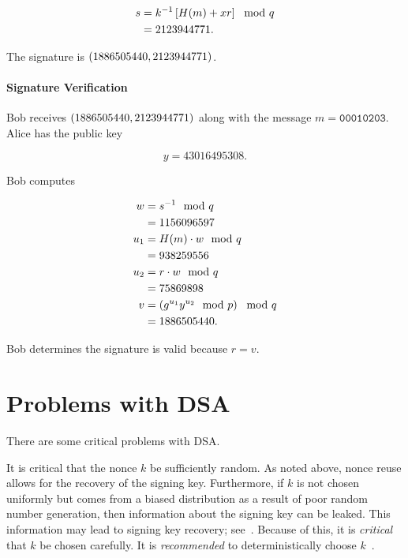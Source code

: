 \begin{example}
\begin{align}
    s &= k^{-1}\left[ H(m) + xr \right] \mod q \nonumber\\
        &= 2123944771.
\end{align}

\noindent
The signature is $\left( 1886505440, 2123944771 \right)$.

\paragraph{Signature Verification}
Bob receives $\left( 1886505440, 2123944771 \right)$
along with the message $m = \texttt{00010203}$.
Alice has the public key

\begin{equation}
    y = 43016495308.
\end{equation}

\noindent
Bob computes

\begin{align}
    w &= s^{-1} \mod q \nonumber\\
        &= 1156096597 \nonumber\\
    u_{1} &= H(m)\cdot w \mod q \nonumber\\
        &= 938259556 \nonumber\\
    u_{2} &= r\cdot w \mod q \nonumber\\
        &= 75869898 \nonumber\\
    v &= \left( g^{u_{1}}y^{u_{2}} \mod p \right) \mod q \nonumber\\
        &= 1886505440.
\end{align}

\noindent
Bob determines the signature is valid because $r = v$.
\end{example}



\section{Problems with DSA}

There are some critical problems with DSA.

It is critical that the \gls{nonce} $k$ be sufficiently random.
As noted above, \gls{nonce} reuse allows for the recovery of the signing key.
Furthermore, if $k$ is not chosen uniformly
but comes from a biased distribution as a result of
poor random number generation,
then information about the signing key can be leaked.
This information may lead to signing key recovery;
see~\cite{PartialNonces2002}.
Because of this, it is \emph{critical} that $k$ be chosen carefully.
It is \emph{recommended} to deterministically choose $k$~\cite{rfc6979}.

